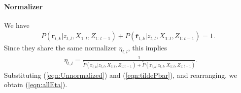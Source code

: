 \documentclass[letterpaper, 10pt, conference]{ieeeconf}
\newcommand{\refeqn}[1]{(\ref{eqn:#1})}
\begin{document}
\begin{appendix}
\paragraph{Normalizer}
We have 
\begin{align*}
P(\mathbf{r}_{l,k}|z_{t,l},X_{1:t},Z_{1:t-1})+
P(\bar{\mathbf{r}}_{l,k}|z_{t,l},X_{1:t},Z_{1:t-1})=1.
\end{align*}
Since they share the same normalizer $\eta_{t,l}$, this implies 
\begin{align*}
&\eta_{t,l}=\frac1{\tilde P(\mathbf{r}_{l,k}|z_{t,l},X_{1:t},Z_{1:t-1})+
\tilde P(\bar{\mathbf{r}}_{l,k}|z_{t,l},X_{1:t},Z_{1:t-1})}.
\end{align*}
Substituting \refeqn{Unnormalized} and \refeqn{tildePbar}, and rearranging, we obtain \refeqn{allEta}.
%


\end{appendix}





\end{document}
